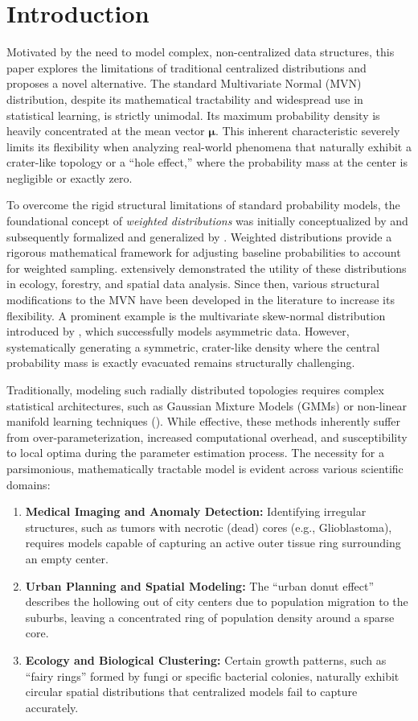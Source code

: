 \documentclass[twoside]{article}
\begin{document}
\section{Introduction}
Motivated by the need to model complex, non-centralized data structures, this paper explores the limitations of traditional centralized distributions and proposes a novel alternative. The standard Multivariate Normal (MVN) distribution, despite its mathematical tractability and widespread use in statistical learning, is strictly unimodal. Its maximum probability density is heavily concentrated at the mean vector $\boldsymbol{\mu}$. This inherent characteristic severely limits its flexibility when analyzing real-world phenomena that naturally exhibit a crater-like topology or a ``hole effect,'' where the probability mass at the center is negligible or exactly zero.

To overcome the rigid structural limitations of standard probability models, the foundational concept of \textit{weighted distributions} was initially conceptualized by \cite{Fisher1934} and subsequently formalized and generalized by \cite{rao1965}. Weighted distributions provide a rigorous mathematical framework for adjusting baseline probabilities to account for weighted sampling. \cite{patil1978} extensively demonstrated the utility of these distributions in ecology, forestry, and spatial data analysis. Since then, various structural modifications to the MVN have been developed in the literature to increase its flexibility. A prominent example is the multivariate skew-normal distribution introduced by \cite{azzalini1985}, which successfully models asymmetric data. However, systematically generating a symmetric, crater-like density where the central probability mass is exactly evacuated remains structurally challenging.

Traditionally, modeling such radially distributed topologies requires complex statistical architectures, such as Gaussian Mixture Models (GMMs) or non-linear manifold learning techniques (\citet{mclachlan2000}). While effective, these methods inherently suffer from over-parameterization, increased computational overhead, and susceptibility to local optima during the parameter estimation process. The necessity for a parsimonious, mathematically tractable model is evident across various scientific domains:
\begin{enumerate}
	\item \textbf{Medical Imaging and Anomaly Detection:} Identifying irregular structures, such as tumors with necrotic (dead) cores (e.g., Glioblastoma), requires models capable of capturing an active outer tissue ring surrounding an empty center.
	\item \textbf{Urban Planning and Spatial Modeling:} The ``urban donut effect'' describes the hollowing out of city centers due to population migration to the suburbs, leaving a concentrated ring of population density around a sparse core.
	\item \textbf{Ecology and Biological Clustering:} Certain growth patterns, such as ``fairy rings'' formed by fungi or specific bacterial colonies, naturally exhibit circular spatial distributions that centralized models fail to capture accurately.
\end{enumerate}
\end{document}
